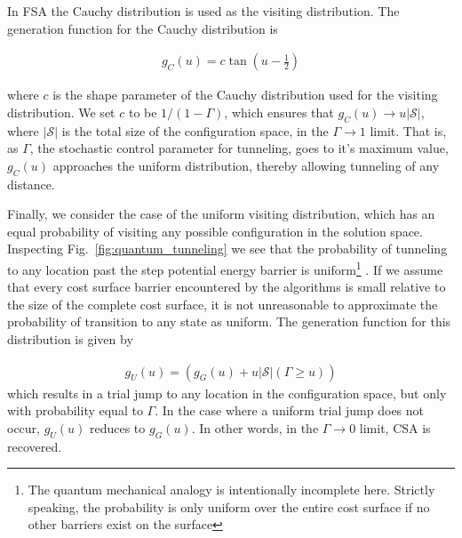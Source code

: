 \documentclass[10pt,journal,cspaper,compsoc]{IEEEtran}
\begin{document}
In FSA the Cauchy distribution is used as the visiting distribution. The generation function for the Cauchy distribution is

\begin{align}\label{eq:cauchy_generation_fcn}
g_{C}(u) =  c \tan\left(u-\frac{1}{2}\right)
\end{align}

\noindent where $c$ is the shape parameter of the Cauchy distribution used for the visiting distribution. We set $c$ to be $1/(1-\Gamma)$, which ensures that $g_{C}(u) \rightarrow u \left| \boldsymbol{\mathcal{S}}\right| $, where $\left| \boldsymbol{\mathcal{S}}\right|$ is the total size of the configuration space, in the $\Gamma \rightarrow 1$ limit. That is, as $\Gamma$, the stochastic control parameter for tunneling, goes to it's maximum value, $g_{C}(u)$ approaches the uniform distribution, thereby allowing tunneling of any distance.


Finally, we consider the case of the uniform visiting distribution, which has an equal probability of visiting any possible configuration in the solution space. Inspecting Fig.~\ref{fig:quantum_tunneling} we see that the probability of tunneling to any location past the step potential energy barrier is uniform\footnote{The quantum mechanical analogy is intentionally incomplete here. Strictly speaking, the probability is only uniform over the entire cost surface if no other barriers exist on the surface} . If we assume that every cost surface barrier encountered by the algorithms is small relative to the size of the complete cost surface, it is not unreasonable to approximate the probability of transition to any state as uniform. The generation function for this distribution is given by

\begin{align}\label{eq:uniform_generation_fcn}
g_{U}(u) = (g_{G}(u) +  u \left| \boldsymbol{\mathcal{S}} \right| (\Gamma\geq u))
\end{align}
\noindent which results in a trial jump to any location in the configuration space, but only with probability equal to $\Gamma$. In the case where a uniform trial jump does not occur, $g_{U}(u)$ reduces to $g_{G}(u)$. In other words, in the $\Gamma \rightarrow 0$ limit, CSA is recovered.
\end{document}
